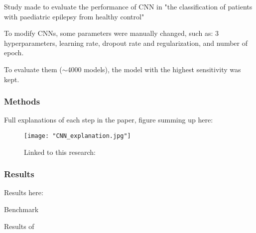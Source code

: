 Study made to evaluate the performance of CNN in "the classification of patients with paediatric epilepsy from healthy control"

To modify CNNs, some parameters were manually changed, such as: 3 hyperparameters, learning rate, dropout rate and regularization, and number of epoch.

To evaluate them ($\sim$4000 models), the model with the highest sensitivity was kept.

\subsubsection{Methods}

Full explanations of each step in the paper, figure summing up here: 

\begin{figure}[htbp]
	\centering
	\texttt{[image: "CNN\_explanation.jpg"]}
	\caption{Linked to this research: }%
	\label{fig:cnn}
\end{figure}

\subsubsection{Results}

Results here: 

\begin{table}[htbp]
	\centering
	\caption{Benchmark}

	\caption{Results of }%

	\caption{Best model parameter values}
	\label{tab:cnn}
\end{table}

